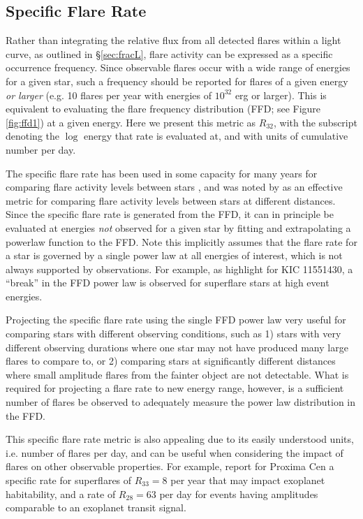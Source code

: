 \documentclass[preprint2]{aastex62}
\begin{document}
\subsection{Specific Flare Rate}
\label{sec:rate}

Rather than integrating the relative flux from all detected flares within a light curve, as outlined in \S\ref{sec:fracL}, flare activity can be expressed as a specific occurrence frequency. Since observable flares occur with a wide range of energies for a given star, such a frequency should be reported for flares of a given energy {\it or larger} (e.g. 10 flares per year with energies of $10^{32}$ erg or larger). This is equivalent to evaluating the flare frequency distribution (FFD; see Figure \ref{fig:ffd1}) at a given energy. Here we present this metric as $R_{32}$, with the subscript denoting the $\log$ energy that rate is evaluated at, and with units of cumulative number per day.

The specific flare rate has been used in some capacity for many years for comparing flare activity levels between stars \citep[e.g.][]{lme1976}, and was noted by \citet{davenport2016} as an effective metric for comparing flare activity levels between stars at different distances. Since the specific flare rate is generated from the FFD, it can in principle be evaluated at energies {\it not} observed for a given star by fitting and extrapolating a powerlaw function to the FFD. Note this implicitly assumes that the flare rate for a star is governed by a single power law at all energies of interest, which is not always supported by observations. For example, as \citet{davenport2016} highlight for KIC 11551430, a ``break'' in the FFD power law is observed for superflare stars at high event energies. 

Projecting the specific flare rate using the single FFD power law very useful for comparing stars with different observing conditions, such as 1) stars with very different observing durations where one star may not have produced many large flares to compare to, or 2) comparing stars at significantly different distances where small amplitude flares from the fainter object are not detectable. What is required for projecting a flare rate to new energy range, however, is a sufficient number of flares be observed to adequately measure the power law distribution in the FFD.

This specific flare rate metric is also appealing due to its easily understood units, i.e. number of flares per day, and can be useful when considering the impact of flares on other observable properties. For example, \citet{davenport2016b} report for Proxima Cen a specific rate for superflares of $R_{33}=8$ per year that may impact exoplanet habitability, and a rate of $R_{28}=63$ per day for events having amplitudes comparable to an exoplanet transit signal.
\end{document}
